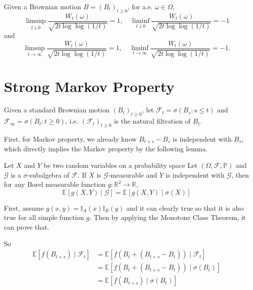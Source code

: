 \begin{thm}
    Given a Brownian motion $B=(B_t)_{t \geq 0}$, for a.e. $\omega \in \Omega$,
    \begin{equation*}
        \limsup _{t \downarrow 0} \frac{W_t(\omega)}{\sqrt{2 t \log \log (1 / t)}}=1,\quad \liminf _{t \downarrow 0} \frac{W_t(\omega)}{\sqrt{2 t \log \log (1 / t)}}=-1
    \end{equation*}
    and
    \begin{equation*}
        \limsup _{t \rightarrow \infty} \frac{W_t(\omega)}{\sqrt{2 t \log \log (1 / t)}}=1,\quad \liminf _{t \rightarrow \infty} \frac{W_t(\omega)}{\sqrt{2 t \log \log (1 / t)}}=-1.
    \end{equation*}
\end{thm}

\section{Strong Markov Property}

Given a standard Brownian motion $(B_t)_{t \geq 0}$, let $\mathcal{F}_t = \sigma(B_s \colon s \leq t)$ and $\mathcal{F}_\infty = \sigma(B_t \colon t \geq 0)$, i.e. $(\mathcal{F}_t)_{t \geq 0}$ is the natural filtration of $B_t$.

\noindent First, for Markov property, we already know $B_{t+s} - B_s$ is independent with $B_s$, which directly implies the Markov property by the following lemma.
\begin{lem}\label{lem1}
    Let $X$ and $Y$ be two random variables on a probability space Let $(\Omega, \mathcal{F}, \mathbb{P})$ and $\mathcal{G}$ is a $\sigma$-subalgebra of $\mathcal{F}$. If $X$ is $\mathcal{G}$-measurable and $Y$ is independent with $\mathcal{G}$, then for any Borel measurable function $g \colon \mathbb{R}^2 \rightarrow \mathbb{R}$,
    \begin{equation*}
        \mathbb{E}[g(X,Y) \mid \mathcal{G}] = \mathbb{E}[g(X,Y) \mid \sigma(X)]
    \end{equation*}
\end{lem}
\begin{rmk}
    First, assume $g(x,y) =\mathbb{I}_A(x)\mathbb{I}_B(y)$ and it can clearly true so that it is also true for all simple function $g$. Then by applying the Monotone Class Theorem, it can prove that.
\end{rmk}
\noindent So
\begin{align*}
    \mathbb{E}\left[f\left(B_{t+s}\right) \mid \mathcal{F}_t\right] & =\mathbb{E}\left[f\left(B_t+\left(B_{t+s}-B_t\right)\right) \mid \mathcal{F}_t\right] \\
    & =\mathbb{E}\left[f\left(B_t+\left(B_{t+s}-B_t\right)\right) \mid \sigma\left(B_t\right)\right] \\
    & =\mathbb{E}\left[f\left(B_{t+s}\right) \mid \sigma\left(B_t\right)\right]
\end{align*}


